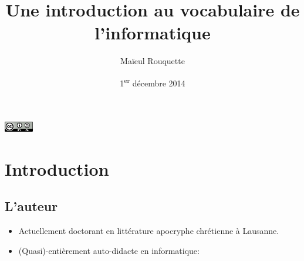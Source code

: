 \documentclass{beamer}
\author{Maïeul Rouquette}
\date{1\textsuperscript{er} décembre 2014}
\title{Une introduction au vocabulaire de l'informatique}
\begin{document}
\begin{slide}
\titlepage

\vfill
\hfill\includegraphics[width=36pt]{cc-by-sa.png}
 \hfill\hbox{}
\end{slide}
\section{Introduction}
\subsection{L'auteur}

\begin{slide}

	\begin{itemize}
		

		\item<+-> Actuellement doctorant en littérature apocryphe chrétienne à Lausanne.

		\item<+-> (Quasi)-entièrement auto-didacte en informatique:
		
	
	\end{itemize}
\end{slide}
\end{document}
